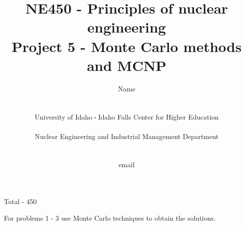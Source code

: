 \documentclass[11pt,a4paper]{article}
\newcommand*\sq{\mathbin{\vcenter{\hbox{\rule{.3ex}{.3ex}}}}} %
\begin{document}
\begin{titlepage}
    \title{
        NE450 - Principles of nuclear engineering\\
        Project 5 - Monte Carlo methods and MCNP\\
    }
    \author{
        Name
        \\ \\ \\
        University of Idaho $\sq$ Idaho Falls Center for Higher Education
        \\ \\
        Nuclear Engineering and Industrial Management Department
        \\ \\ \\
        email 
    }
\clearpage %
\maketitle
\vspace*{\fill}
\begin{flushright}{
        Total - 450 
}
\end{flushright}
\thispagestyle{empty} %
\end{titlepage}

\noindent For problems 1 - 3 use Monte Carlo techniques to obtain the solutions. \\
\end{document}
